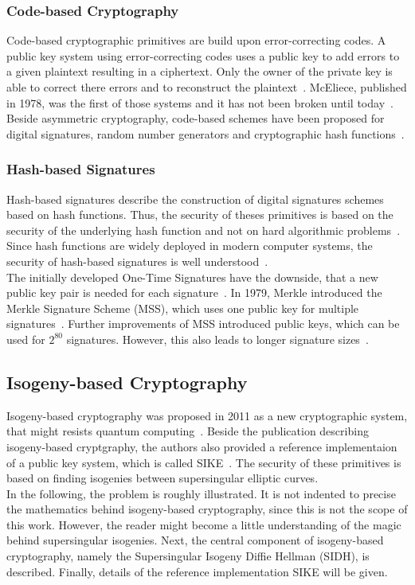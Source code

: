 \subsubsection{Code-based Cryptography}
Code-based cryptographic primitives are build upon error-correcting codes. A public key system using error-correcting codes uses a public key to add errors to a given plaintext resulting in a ciphertext. Only the owner of the private key is able to correct there errors and to reconstruct the plaintext~\parencite{bernstein2017post}. McEliece, published in 1978, was the first of those systems and it has not been broken until today~\parencite{mceliece1978public}.
Beside asymmetric cryptography, code-based schemes have been proposed for digital signatures, random number generators and cryptographic hash functions~\parencite{bernstein2017post}.
\subsubsection{Hash-based Signatures}
Hash-based signatures describe the construction of digital signatures schemes based on hash functions. Thus, the security of theses primitives is based on the security of the underlying hash function and not on hard algorithmic problems~\parencite{bernstein2017post}. Since hash functions are widely deployed in modern computer systems, the security of hash-based signatures is well understood~\parencite{chen2016report}.\\
The initially developed One-Time Signatures have the downside, that a new public key pair is needed for each signature~\parencite{becker2008merkle}. In 1979, Merkle introduced the Merkle Signature Scheme (MSS), which uses one public key for multiple signatures~\parencite{merkle1979secrecy}. Further improvements of MSS introduced public keys, which can be used for $2^{80}$ signatures. However, this also leads to longer signature sizes~\parencite{becker2008merkle}.

\subsection{Isogeny-based Cryptography} \label{sec:isogeny-based_crypto}
Isogeny-based cryptography was proposed in 2011 as a new cryptographic system, that might resists quantum computing~\parencite{jao2011towards}. Beside the publication describing isogeny-based cryptgraphy, the authors also provided a reference implementaion of a public key system, which is called SIKE~\parencite{sike2020spec}. The security of these primitives is based on finding isogenies between supersingular elliptic curves.\\
In the following, the problem is roughly illustrated. It is not indented to precise the mathematics behind isogeny-based cryptography, since this is not the scope of this work. However, the reader might become a little understanding of the magic behind supersingular isogenies. Next, the central component of isogeny-based cryptography, namely the Supersingular Isogeny Diffie Hellman (SIDH), is described. Finally, details of the reference implementation SIKE will be given.


